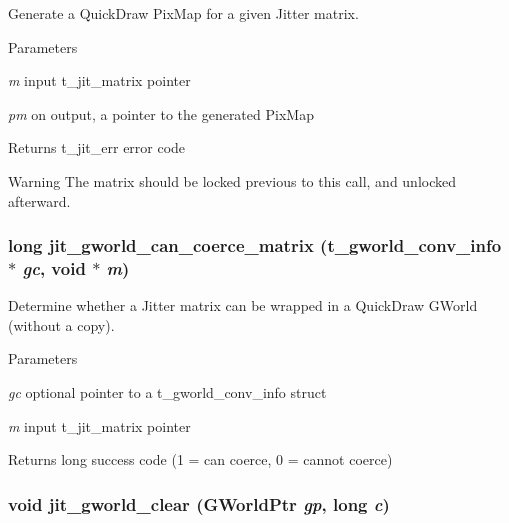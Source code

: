 Generate a QuickDraw PixMap for a given Jitter matrix. 
\begin{DoxyParams}{Parameters}
\item[{\em m}]input t\_\-jit\_\-matrix pointer \item[{\em pm}]on output, a pointer to the generated PixMap\end{DoxyParams}
\begin{DoxyReturn}{Returns}
t\_\-jit\_\-err error code
\end{DoxyReturn}
\begin{DoxyWarning}{Warning}
The matrix should be locked previous to this call, and unlocked afterward. 
\end{DoxyWarning}
\hypertarget{group__qtutilsmod_gae02418456d361112ae3d1d6ac40a58e8}{
\subsubsection[{jit\_\-gworld\_\-can\_\-coerce\_\-matrix}]{\setlength{\rightskip}{0pt plus 5cm}long jit\_\-gworld\_\-can\_\-coerce\_\-matrix (t\_\-gworld\_\-conv\_\-info $\ast$ {\em gc}, \/  void $\ast$ {\em m})}}
\label{group__qtutilsmod_gae02418456d361112ae3d1d6ac40a58e8}


Determine whether a Jitter matrix can be wrapped in a QuickDraw GWorld (without a copy). 
\begin{DoxyParams}{Parameters}
\item[{\em gc}]optional pointer to a t\_\-gworld\_\-conv\_\-info struct \item[{\em m}]input t\_\-jit\_\-matrix pointer\end{DoxyParams}
\begin{DoxyReturn}{Returns}
long success code (1 = can coerce, 0 = cannot coerce) 
\end{DoxyReturn}
\hypertarget{group__qtutilsmod_ga368de0a058f98dbfcf8259528f1daa39}{
\subsubsection[{jit\_\-gworld\_\-clear}]{\setlength{\rightskip}{0pt plus 5cm}void jit\_\-gworld\_\-clear (GWorldPtr {\em gp}, \/  long {\em c})}}
\label{group__qtutilsmod_ga368de0a058f98dbfcf8259528f1daa39}


